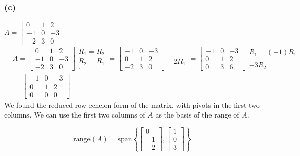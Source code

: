 \documentclass[10pt,letterpaper]{article}
\begin{document}
	\subsubsection*{(c)} \textbf{$A = \begin{bmatrix}
		0 & 1 & 2 \\ -1 & 0 & -3 \\ -2 & 3 & 0
		\end{bmatrix}$} 
	\begin{align*}
	& A = \begin{bmatrix}
	0 & 1 & 2 \\ -1 & 0 & -3 \\ -2 & 3 & 0
	\end{bmatrix} \begin{array}{c}
	R_1 = R_2 \\ R_2 = R_1 \\ .
	\end{array} = \begin{bmatrix}
	-1 & 0 & -3 \\ 0 & 1 & 2 \\  -2 & 3 & 0
	\end{bmatrix} \begin{array}{c}
	\\ \\ -2R_1 
	\end{array} = \begin{bmatrix}
	-1 & 0 & -3 \\ 0 & 1 & 2 \\  0 & 3 & 6
	\end{bmatrix} \begin{array}{c}
	R_1 = (-1)R_1\\ \\ -3R_2
	\end{array} \\ 
	& = \begin{bmatrix}
	-1 & 0 & -3 \\ 0 & 1 & 2 \\  0 & 0 & 0
	\end{bmatrix}
	\end{align*}
	We found the reduced row echelon form of the matrix, with pivots in the first two columns.  We can use the first two columns of $A$ as the basis of the range of $A$. 
	
	$$
	\boxed{\text{range}(A) = \text{span} \left\lbrace \begin{bmatrix}
	0 \\ -1 \\ -2
	\end{bmatrix}, \begin{bmatrix}
	1 \\ 0 \\ 3
	\end{bmatrix} \right\rbrace }
	$$
	
\end{document}
